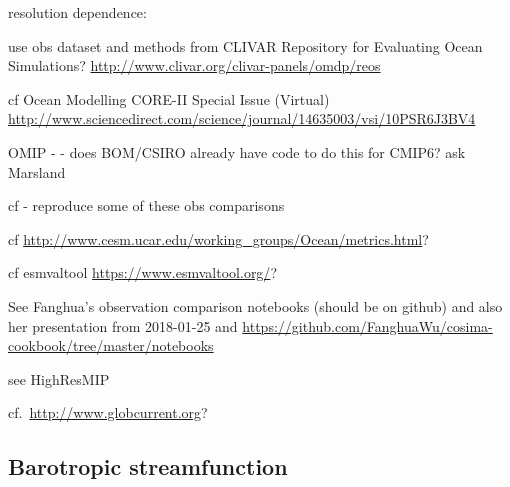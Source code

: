 \documentclass[11pt]{article}
\begin{document}
% 

% 


resolution dependence: \citet{KirtmanETAL2012a}

use obs dataset and methods from CLIVAR Repository for Evaluating Ocean Simulations? \url{http://www.clivar.org/clivar-panels/omdp/reos}
 
 cf Ocean Modelling CORE-II Special Issue (Virtual) \url{http://www.sciencedirect.com/science/journal/14635003/vsi/10PSR6J3BV4}

OMIP - \citet{GriffiesETAL2016a} - does BOM/CSIRO already have code to do this for CMIP6? ask Marsland

cf \citet{OkeETAL2013a} - reproduce some of these obs comparisons

cf \url{http://www.cesm.ucar.edu/working_groups/Ocean/metrics.html}?

cf esmvaltool \url{https://www.esmvaltool.org/}?

See Fanghua's observation comparison notebooks (should be on github) and also her presentation from 2018-01-25
and \url{https://github.com/FanghuaWu/cosima-cookbook/tree/master/notebooks}

see HighResMIP \citep{HaarsmaETAL2016a}

cf.\ \url{http://www.globcurrent.org}?

\subsection{Barotropic streamfunction}
\end{document}
